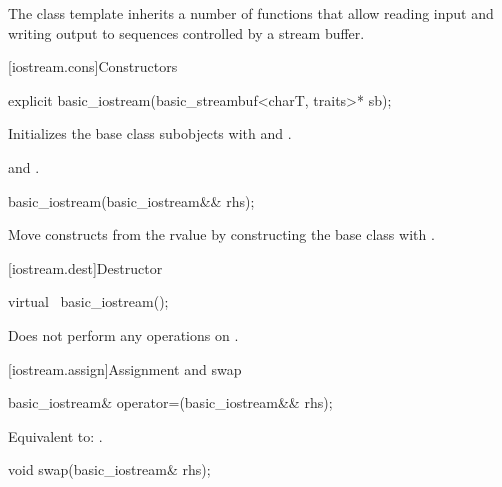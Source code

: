 \pnum
The class template
inherits a number of functions that allow reading input and writing output to
sequences controlled by a stream buffer.

[iostream.cons]{Constructors}

%
\begin{itemdecl}
explicit basic_iostream(basic_streambuf<charT, traits>* sb);
\end{itemdecl}

\begin{itemdescr}
\pnum
\effects
Initializes the base class subobjects with
and
.

\pnum
\ensures
{}
and
.
\end{itemdescr}

%
\begin{itemdecl}
basic_iostream(basic_iostream&& rhs);
\end{itemdecl}

\begin{itemdescr}
\pnum
\effects
Move constructs from the rvalue  by
constructing the  base class with
.
\end{itemdescr}

[iostream.dest]{Destructor}

%
\begin{itemdecl}
virtual ~basic_iostream();
\end{itemdecl}

\begin{itemdescr}
\pnum
\remarks
Does not perform any operations on
.
\end{itemdescr}

[iostream.assign]{Assignment and swap}

%
\begin{itemdecl}
basic_iostream& operator=(basic_iostream&& rhs);
\end{itemdecl}

\begin{itemdescr}
\pnum
\effects
Equivalent to: .
\end{itemdescr}

%
\begin{itemdecl}
void swap(basic_iostream& rhs);
\end{itemdecl}

